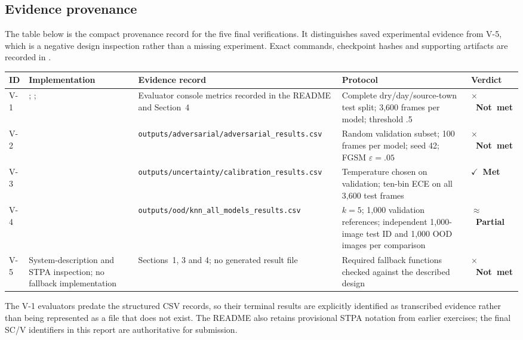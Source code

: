 \documentclass[nologo,a4paper,12pt]{article}
\makeatletter
\newcommand{\verdictmet}{\textbf{\color{mls@green}$\checkmark$~Met}}
\newcommand{\verdictnotmet}{\textbf{\color{mls@red}$\times$~Not met}}
\newcommand{\verdictpartial}{\textbf{\color{mls@yellow}$\approx$~Partial}}
\makeatother
\begin{document}
\subsection{Evidence provenance}
\label{app:evidence-provenance}

The table below is the compact provenance record for the five final verifications. It distinguishes
saved experimental evidence from V-5, which is a negative design inspection rather than a missing
experiment. Exact commands, checkpoint hashes and supporting artifacts are recorded in
.

{\scriptsize
\renewcommand{\arraystretch}{1.12}
\begin{tabularx}{\linewidth}{@{}p{.62cm}p{3.45cm}p{3.75cm}Yp{1.65cm}@{}}
\toprule
\textbf{ID} & \textbf{Implementation} & \textbf{Evidence record} & \textbf{Protocol} & \textbf{Verdict} \\
\midrule
V-1
& ; ; 
& Evaluator console metrics recorded in the README and Section~4
& Complete dry/day/source-town test split; 3,600 frames per model; threshold .5
& \mbox{\verdictnotmet} \\
\addlinespace[.35em]
V-2
& 
& \nolinkurl{outputs/adversarial/adversarial_results.csv}
& Random validation subset; 100 frames per model; seed 42; FGSM $\varepsilon=.05$
& \mbox{\verdictnotmet} \\
\addlinespace[.35em]
V-3
& 
& \nolinkurl{outputs/uncertainty/calibration_results.csv}
& Temperature chosen on validation; ten-bin ECE on all 3,600 test frames
& \mbox{\verdictmet} \\
\addlinespace[.35em]
V-4
& 
& \nolinkurl{outputs/ood/knn_all_models_results.csv}
& $k=5$; 1,000 validation references; independent 1,000-image test ID and 1,000 OOD images per comparison
& \mbox{\verdictpartial} \\
\addlinespace[.35em]
V-5
& System-description and STPA inspection; no fallback implementation
& Sections~1, 3 and 4; no generated result file
& Required fallback functions checked against the described design
& \mbox{\verdictnotmet} \\
\bottomrule
\end{tabularx}}

The V-1 evaluators predate the structured CSV records, so their terminal results are explicitly
identified as transcribed evidence rather than being represented as a file that does not exist.
The README also retains provisional STPA notation from earlier exercises; the final SC/V identifiers
in this report are authoritative for submission.
\end{document}
